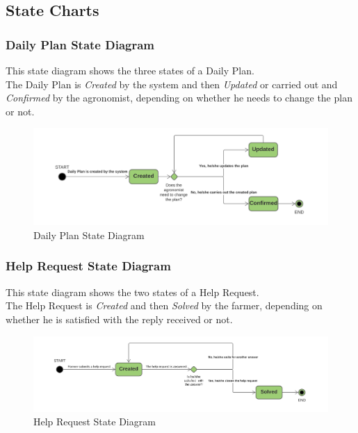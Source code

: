 \subsection{State Charts}

\subsubsection{Daily Plan State Diagram}
This state diagram shows the three states of a Daily Plan.\\
The Daily Plan is \textit{Created} by the system and then \textit{Updated} or carried out and \textit{Confirmed} by the agronomist, depending on whether he needs to change the plan or not.
\begin{figure}[h!]
  \includegraphics[width=\textwidth,height=\textheight,keepaspectratio]{./Images/State Chart DailyPlan.png}
  \caption{Daily Plan State Diagram}
\end{figure}

\subsubsection{Help Request State Diagram}
This state diagram shows the two states of a Help Request.\\
The Help Request is \textit{Created} and then \textit{Solved} by the farmer, depending on whether he is satisfied with the reply received or not.
\begin{figure}[h!]
  \includegraphics[width=\textwidth,height=\textheight,keepaspectratio]{./Images/State Chart HelpRequest.png}
  \caption{Help Request State Diagram}
\end{figure}

